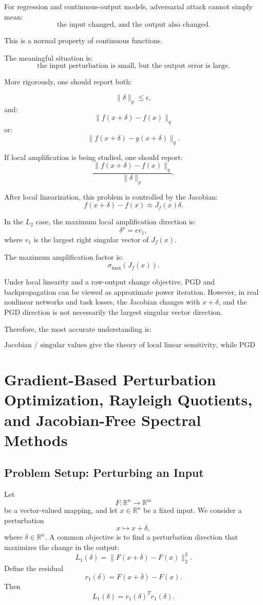 \documentclass{article}
\begin{document}
For regression and continuous-output models, adversarial attack cannot simply mean:
\[
\text{the input changed, and the output also changed.}
\]

This is a normal property of continuous functions.

The meaningful situation is:
\[
\text{the input perturbation is small, but the output error is large.}
\]

More rigorously, one should report both:

\[
\|\delta\|_p\leq \epsilon,
\]
and:
\[
\|f(x+\delta)-f(x)\|_q
\]
or:
\[
\|f(x+\delta)-y(x+\delta)\|_q.
\]

If local amplification is being studied, one should report:
\[
\frac{
\|f(x+\delta)-f(x)\|_q
}{
\|\delta\|_p
}.
\]

After local linearization, this problem is controlled by the Jacobian:
\[
f(x+\delta)-f(x)\approx J_f(x)\delta.
\]

In the \(L_2\) case, the maximum local amplification direction is:
\[
\delta^\star=\epsilon v_1,
\]
where \(v_1\) is the largest right singular vector of \(J_f(x)\).

The maximum amplification factor is:
\[
\sigma_{\max}(J_f(x)).
\]

Under local linearity and a raw-output change objective, PGD and backpropagation can be viewed as approximate power iteration. However, in real nonlinear networks and task losses, the Jacobian changes with \(x+\delta\), and the PGD direction is not necessarily the largest singular vector direction.

Therefore, the most accurate understanding is:

\[
\boxed{
\text{Jacobian / singular values give the theory of local linear sensitivity, while PGD numerically searches for bad perturbations on a nonlinear model using gradients.}
}
\]

\section{Gradient-Based Perturbation Optimization, Rayleigh Quotients, and Jacobian-Free Spectral Methods}

\subsection{Problem Setup: Perturbing an Input}

Let
\[
F:\mathbb{R}^n\to \mathbb{R}^m
\]
be a vector-valued mapping, and let \(x\in \mathbb{R}^n\) be a fixed input. We consider a perturbation
\[
x \mapsto x+\delta,
\]
where \(\delta\in \mathbb{R}^n\). A common objective is to find a perturbation direction that maximizes the change in the output:
\[
L_1(\delta)
=
\|F(x+\delta)-F(x)\|_2^2.
\]
Define the residual
\[
r_1(\delta)=F(x+\delta)-F(x).
\]
Then
\[
L_1(\delta)=r_1(\delta)^T r_1(\delta).
\]
\end{document}
